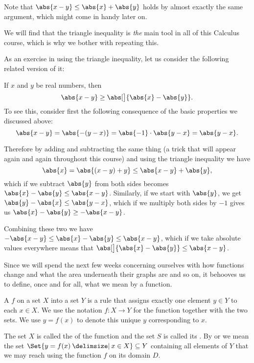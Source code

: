 \noindent
Note that $\abs{x - y} \leq \abs{x} + \abs{y}$ holds by almost exactly the same argument, which might come in handy later on.

We will find that the triangle inequality is \emph{the} main tool in all of this Calculus course, which is why we bother with repeating this.

As an exercise in using the triangle inequality, let us consider the following related version of it:

\begin{example}
	If $x$ and $y$ be real numbers, then
	\[
		\abs{x - y} \geq \abs[\big]{\abs{x} - \abs{y}}.
	\]
	To see this, consider first the following consequence of the basic properties we discussed above:
	\[
		\abs{x - y} = \abs{-(y - x)} = \abs{-1} \cdot \abs{y - x} = \abs{y - x}.
	\]

	\noindent
	Therefore by adding and subtracting the same thing (a trick that will appear again and again throughout this course) and using the triangle inequality we have
	\[
		\abs{x} = \abs{(x - y) + y} \leq \abs{x - y} + \abs{y},
	\]
	which if we subtract $\abs{y}$ from both sides becomes $\abs{x} - \abs{y} \leq \abs{x - y}$. Similarly, if we start with $\abs{y}$, we get $\abs{y} - \abs{x} \leq \abs{y - x}$, which if we multiply both sides by $-1$ gives us $\abs{x} - \abs{y} \geq - \abs{x - y}$.

	Combining these two we have $- \abs{x - y} \leq \abs{x} - \abs{y} \leq \abs{x - y}$, which if we take absolute values everywhere means that $\abs[\big]{\abs{x} - \abs{y}} \leq \abs{x - y}$.
\end{example}


Since we will spend the next few weeks concerning ourselves with how functions change and what the area underneath their graphs are and so on, it behooves us to define, once and for all, what we mean by a function.

\begin{definition}
	A  $f$ on a set $X$ into a set $Y$ is a rule that assigns exactly one element $y \in Y$ to each $x \in X$. We use the notation $f \colon X \to Y$ for the function together with the two sets. We use $y = f(x)$ to denote this unique $y$ corresponding to $x$.

	The set $X$ is called the  of the function and the set $S$ is called its . By  or  we mean the set $\Set{y = f(x) \given x \in X} \subseteq Y$ containing all elements of $Y$ that we may reach using the function $f$ on its domain $D$.
\end{definition}


